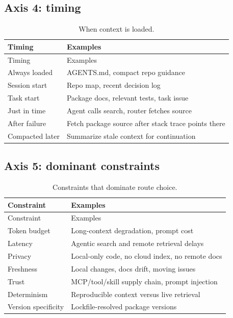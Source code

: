 \documentclass[
  11pt,
  letterpaper,
  numbers=noendperiod,
  parskip=half]{scrartcl}
\begin{document}
\subsection{Axis 4: timing}\label{sec-axis-timing}

\begin{longtable}[]{@{}ll@{}}
\caption{When context is loaded.}\label{tbl-timing}\tabularnewline
\toprule\noalign{}
Timing & Examples \\
\midrule\noalign{}
\endfirsthead
\toprule\noalign{}
Timing & Examples \\
\midrule\noalign{}
\endhead
\bottomrule\noalign{}
\endlastfoot
Always loaded & AGENTS.md, compact repo guidance \\
Session start & Repo map, recent decision log \\
Task start & Package docs, relevant tests, task issue \\
Just in time & Agent calls search, router fetches source \\
After failure & Fetch package source after stack trace points there \\
Compacted later & Summarize stale context for continuation \\
\end{longtable}

\subsection{Axis 5: dominant constraints}\label{sec-axis-constraints}

\begin{longtable}[]{@{}ll@{}}
\caption{Constraints that dominate route
choice.}\label{tbl-constraints}\tabularnewline
\toprule\noalign{}
Constraint & Examples \\
\midrule\noalign{}
\endfirsthead
\toprule\noalign{}
Constraint & Examples \\
\midrule\noalign{}
\endhead
\bottomrule\noalign{}
\endlastfoot
Token budget & Long-context degradation, prompt cost \\
Latency & Agentic search and remote retrieval delays \\
Privacy & Local-only code, no cloud index, no remote docs \\
Freshness & Local changes, docs drift, moving issues \\
Trust & MCP/tool/skill supply chain, prompt injection \\
Determinism & Reproducible context versus live retrieval \\
Version specificity & Lockfile-resolved package versions \\
\end{longtable}
\end{document}
